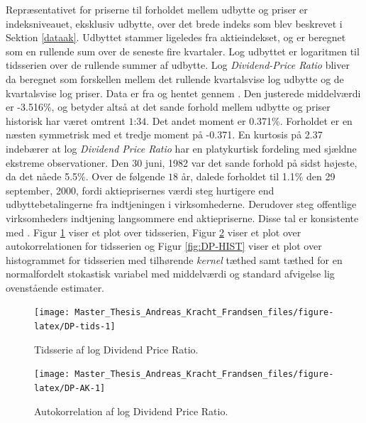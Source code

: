 \documentclass[
  a4paper,
  oneside]{memoir}
\begin{document}
Repræsentativet for priserne til forholdet mellem udbytte og priser er indeksniveauet, eksklusiv udbytte, over det brede indeks som blev beskrevet i Sektion \ref{dataak}. Udbyttet stammer ligeledes fra aktieindekset, og er beregnet som en rullende sum over de seneste fire kvartaler. Log udbyttet er logaritmen til tidsserien over de rullende summer af udbytte. Log \emph{Dividend-Price Ratio} bliver da beregnet som forskellen mellem det rullende kvartalsvise log udbytte og de kvartalsvise log priser. Data er fra \citep{CRSPakt} og hentet gennem \citep{WRDSakt}. Den justerede middelværdi er -3.516\(\%\), og betyder altså at det sande forhold mellem udbytte og priser historisk har været omtrent \(1\):\(34\). Det andet moment er 0.371\(\%\). Forholdet er en næsten symmetrisk med et tredje moment på -0.371. En kurtosis på 2.37 indebærer at log \emph{Dividend Price Ratio} har en platykurtisk fordeling med sjældne ekstreme observationer. Den 30 juni, 1982 var det sande forhold på sidst højeste, da det nåede 5.5\(\%\). Over de følgende \(18\) år, dalede forholdet til 1.1\(\%\) den 29 september, 2000, fordi aktieprisernes værdi steg hurtigere end udbyttebetalingerne fra indtjeningen i virksomhederne. Derudover steg offentlige virksomheders indtjening langsommere end aktiepriserne. Disse tal er konsistente med \citep{CampVic2003}. Figur \ref{fig:DP-tids} viser et plot over tidsserien, Figur \ref{fig:DP-AK} viser et plot over autokorrelationen for tidsserien og Figur \ref{fig:DP-HIST} viser et plot over histogrammet for tidsserien med tilhørende \emph{kernel} tæthed samt tæthed for en normalfordelt stokastisk variabel med middelværdi og standard afvigelse lig ovenstående estimater.

\begin{figure}[htbp!]

{\centering \texttt{[image: Master\_Thesis\_Andreas\_Kracht\_Frandsen\_files/figure-latex/DP-tids-1]} 

}

\caption{Tidsserie af log Dividend Price Ratio.}\label{fig:DP-tids}
\end{figure}

\begin{figure}[htbp!]

{\centering \texttt{[image: Master\_Thesis\_Andreas\_Kracht\_Frandsen\_files/figure-latex/DP-AK-1]} 

}

\caption{Autokorrelation af log Dividend Price Ratio.}\label{fig:DP-AK}
\end{figure}
\end{document}
